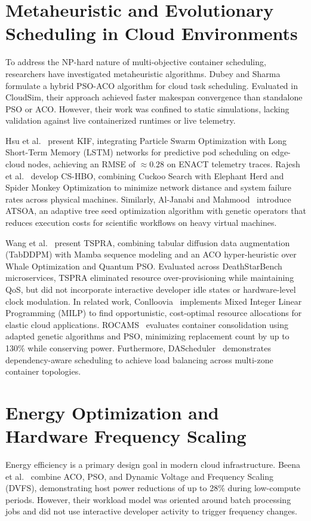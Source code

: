 \documentclass[12pt,a4paper]{report}
\begin{document}
\section{Metaheuristic and Evolutionary Scheduling in Cloud Environments}
To address the NP-hard nature of multi-objective container scheduling, researchers have investigated metaheuristic algorithms. Dubey and Sharma~\cite{psoaco} formulate a hybrid PSO-ACO algorithm for cloud task scheduling. Evaluated in CloudSim, their approach achieved faster makespan convergence than standalone PSO or ACO. However, their work was confined to static simulations, lacking validation against live containerized runtimes or live telemetry.

Hsu et al.~\cite{pso_lstm} present KIF, integrating Particle Swarm Optimization with Long Short-Term Memory (LSTM) networks for predictive pod scheduling on edge-cloud nodes, achieving an RMSE of $\approx 0.28$ on ENACT telemetry traces. Rajesh et al.~\cite{cshbo} develop CS-HBO, combining Cuckoo Search with Elephant Herd and Spider Monkey Optimization to minimize network distance and system failure rates across physical machines. Similarly, Al-Janabi and Mahmood~\cite{atsoa} introduce ATSOA, an adaptive tree seed optimization algorithm with genetic operators that reduces execution costs for scientific workflows on heavy virtual machines.

Wang et al.~\cite{tspra} present TSPRA, combining tabular diffusion data augmentation (TabDDPM) with Mamba sequence modeling and an ACO hyper-heuristic over Whale Optimization and Quantum PSO. Evaluated across DeathStarBench microservices, TSPRA eliminated resource over-provisioning while maintaining QoS, but did not incorporate interactive developer idle states or hardware-level clock modulation. In related work, Conlloovia~\cite{conlloovia} implements Mixed Integer Linear Programming (MILP) to find opportunistic, cost-optimal resource allocations for elastic cloud applications. ROCAMS~\cite{rocams} evaluates container consolidation using adapted genetic algorithms and PSO, minimizing replacement count by up to 130\% while conserving power. Furthermore, DAScheduler~\cite{dascheduler} demonstrates dependency-aware scheduling to achieve load balancing across multi-zone container topologies.

\section{Energy Optimization and Hardware Frequency Scaling}
Energy efficiency is a primary design goal in modern cloud infrastructure. Beena et al.~\cite{dvfs} combine ACO, PSO, and Dynamic Voltage and Frequency Scaling (DVFS), demonstrating host power reductions of up to 28\% during low-compute periods. However, their workload model was oriented around batch processing jobs and did not use interactive developer activity to trigger frequency changes.
\end{document}
